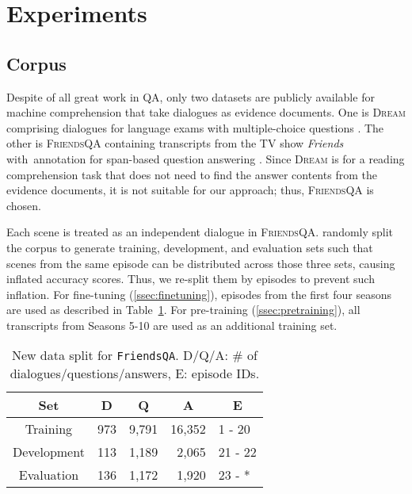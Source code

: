 \documentclass[11pt,a4paper]{article}
\newcommand{\textsec}[1]{\textsection\ref{#1}}
\newcommand{\LN}{\linebreak\noindent}
\begin{document}
 \section{Experiments}
\label{sec:experiments}

\subsection{Corpus}
\label{ssec:corpus}

Despite of all great work in QA, only two datasets are publicly available for machine comprehension that take dialogues as evidence documents.
One is \textsc{Dream} comprising dialogues for language exams with multiple-choice questions \cite{Sun_2019}.\LN
The other is \textsc{FriendsQA} containing transcripts from the TV show \textit{Friends} with\ annotation for span-based question answering \cite{yang_2019}.\LN
Since \textsc{Dream} is for a reading comprehension task that does not need to find the answer contents from the evidence documents, it is not suitable for our approach; thus, \textsc{FriendsQA} is chosen.

Each scene is treated as an independent dialogue in \textsc{FriendsQA}.
\citet{yang_2019} randomly split the corpus to generate training, development, and evaluation sets such that scenes from the same episode can be distributed across those three sets, causing inflated accuracy scores.
Thus, we re-split them by episodes to prevent such inflation.
For fine-tuning (\textsec{ssec:finetuning}), episodes from the first four seasons are used as described in Table~\ref{tbl:dataset-stats}.
For pre-training (\textsec{ssec:pretraining}), all transcripts from Seasons 5-10 are used as an additional training set.

\begin{table}[htbp!]
\centering\small
\begin{tabular}{c||r|r|r||l}
\bf Set & \multicolumn{1}{c|}{\bf D} & \multicolumn{1}{c|}{\bf Q} & \multicolumn{1}{c||}{\bf A} & \multicolumn{1}{c}{\bf E} \\
\hline\hline
Training    & 973 & 9,791 & 16,352 & 1 - 20 \\
Development & 113 & 1,189 &  2,065 & 21 - 22 \\
Evaluation  & 136 & 1,172 &  1,920 & 23 - *  \\
\end{tabular}
\caption{New data split for \texttt{FriendsQA}. D/Q/A: \# of dialogues/questions/answers, E: episode IDs.}
\label{tbl:dataset-stats}
\vspace{-2ex}
\end{table}
\end{document}

